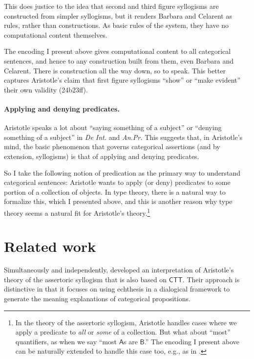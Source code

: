 \documentclass{article}
\newcommand\e{\mathsf}
\def\AnPr/{\emph{An.Pr.}}
\def\DeInterp/{\emph{De Int.}}
\def\CTT/{$\e{CTT}$}
\def\A/{\e{A}}
\def\B/{\e{B}}
\begin{document}
This does justice to the idea that second and third figure syllogisms are constructed from simpler syllogisms, but it renders Barbara and Celarent as rules, rather than constructions. As basic rules of the system, they have no computational content themselves.

The encoding I present above gives computational content to all categorical sentences, and hence to any construction built from them, even Barbara and Celarent. There is construction all the way down, so to speak. This better captures Aristotle's claim that first figure syllogisms ``show'' or ``make evident'' their own validity (24b23ff).


\paragraph{Applying and denying predicates.}

Aristotle speaks a lot about ``saying something of a subject'' or ``denying something of a subject'' in \DeInterp/ and \AnPr/ This suggests that, in Aristotle's mind, the basic phenomenon that governs categorical assertions (and by extension, syllogisms) is that of applying and denying predicates.

So I take the following notion of predication as the primary way to understand categorical sentences: Aristotle wants to apply (or deny) predicates to some portion of a collection of objects. In type theory, there is a natural way to formalize this, which I presented above, and this is another reason why type theory seems a natural fit for Aristotle's theory.\footnote{In the theory of the assertoric syllogism, Aristotle handles cases where we apply a predicate to \emph{all} or \emph{some} of a collection. But what about ``most'' quantifiers, as when we say ``most $\A/$s are $\B/$.'' The encoding I present above can be naturally extended to handle this case too, e.g., as in \citet{Sundholm1989}.}


\section{Related work}
\label{sec:related-work}

Simultaneously and independently, \citet{CrubellierEtAl2019} developed an interpretation of Aristotle's theory of the assertoric syllogism that is also based on \CTT/. Their approach is distinctive in that it focuses on using echthesis in a dialogical framework to generate the meaning explanations of categorical propositions.
\end{document}

